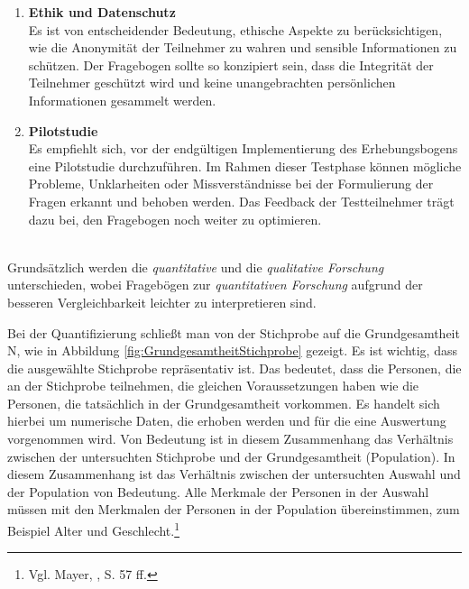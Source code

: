 \begin{enumerate}
    \item \textbf{Ethik und Datenschutz}\\
    Es ist von entscheidender Bedeutung, ethische Aspekte zu berücksichtigen, wie die Anonymität der Teilnehmer zu wahren
    und sensible Informationen zu schützen. Der Fragebogen sollte so konzipiert sein, dass die Integrität der Teilnehmer
    geschützt wird und keine unangebrachten persönlichen Informationen gesammelt werden.

    \item \textbf{Pilotstudie}\\
    Es empfiehlt sich, vor der endgültigen Implementierung des Erhebungsbogens eine Pilotstudie durchzuführen. Im Rahmen
    dieser Testphase können mögliche Probleme, Unklarheiten oder Missverständnisse bei der Formulierung der Fragen erkannt
    und behoben werden. Das Feedback der Testteilnehmer trägt dazu bei, den Fragebogen noch weiter zu optimieren.
\end{enumerate}
\\

Grundsätzlich werden die \textit{quantitative} und die \textit{qualitative Forschung} unterschieden, wobei Fragebögen zur
\textit{quantitativen Forschung} aufgrund der besseren Vergleichbarkeit leichter zu interpretieren sind.

Bei der Quantifizierung schließt man von der Stichprobe auf die Grundgesamtheit N, wie in Abbildung \ref{fig:GrundgesamtheitStichprobe}
gezeigt. Es ist wichtig, dass die ausgewählte Stichprobe repräsentativ ist. Das bedeutet, dass die Personen, die an der
Stichprobe teilnehmen, die gleichen Voraussetzungen haben wie die Personen, die tatsächlich in der Grundgesamtheit vorkommen.
Es handelt sich hierbei um numerische Daten, die erhoben werden und für die eine Auswertung vorgenommen wird. Von Bedeutung
ist in diesem Zusammenhang das Verhältnis zwischen der untersuchten Stichprobe und der Grundgesamtheit (Population). In
diesem Zusammenhang ist das Verhältnis zwischen der untersuchten Auswahl und der Population von Bedeutung. Alle Merkmale
der Personen in der Auswahl müssen mit den Merkmalen der Personen in der Population übereinstimmen, zum Beispiel Alter
und Geschlecht.\footnote{Vgl. Mayer, \cite{Interview und schriftliche Befragung}, S. 57 ff.}

